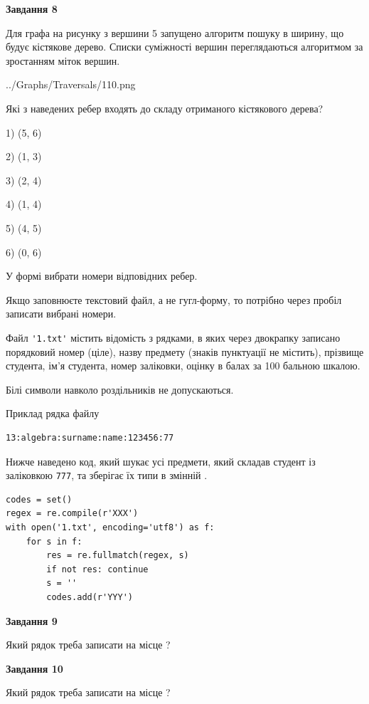 \documentclass[12pt, ukrainian]{article}
\def\code#1{\Verb!#1!}
\begin{document}
{\begin {large}
{\begin {center}\textbf{Завдання 8}\end {center}}\par
Для графа на рисунку з вершини 5 запущено алгоритм пошуку в ширину, що будує кістякове дерево. Списки суміжності вершин переглядаються алгоритмом за зростанням міток вершин.\par
\begin{center}
	{../Graphs/Traversals/110.png}
\end{center}
\par Які з наведених ребер входять до складу отриманого кістякового дерева?\par
1) (5, 6)\par
2) (1, 3)\par
3) (2, 4)\par
4) (1, 4)\par
5) (4, 5)\par
6) (0, 6)\par
{\vskip 15pt} У формі вибрати номери відповідних ребер.


Якщо заповнюєте текстовий файл, а не гугл-форму, то потрібно через пробіл записа\-ти вибрані номери.\par
\newpage


Файл \code{'1.txt'} містить відомість з рядками, в яких через двокрапку записано поряд\-ковий номер (ціле), назву предмету (знаків пунктуації не містить), прізвище студента, ім'я студента, номер заліковки, оцінку в балах за 100 бальною шкалою.

Білі символи навколо роздільників не допускаються.

Приклад рядка файлу



\begin{verbatim}
13:algebra:surname:name:123456:77
\end{verbatim}


Нижче наведено код, який шукає усі предмети, який складав студент із заліковкою \code{777}, та зберігає їх типи в змінній .



\begin{verbatim}
codes = set()
regex = re.compile(r'XXX')
with open('1.txt', encoding='utf8') as f:
    for s in f:
        res = re.fullmatch(regex, s)
        if not res: continue
        s = ''
        codes.add(r'YYY')
\end{verbatim}


{\begin {center}\textbf{Завдання 9}\end {center}}\par
Який рядок треба записати на місце  ?\par
\vspace{5mm}


{\begin {center}\textbf{Завдання 10}\end {center}}\par
Який рядок треба записати на місце  ?\par


\newpage


\end {large}}
\end{document}
